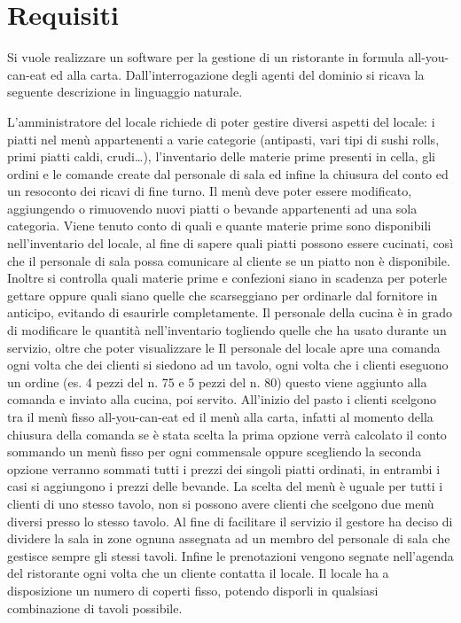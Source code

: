 \documentclass[a4paper,12pt]{report}
\begin{document}
\section{Requisiti}
Si vuole realizzare un software per la gestione di un ristorante in formula all-you-can-eat ed alla carta.
%
Dall’interrogazione degli agenti del dominio si ricava la seguente descrizione in linguaggio naturale.
\begin{mdframed}
    L’amministratore del locale richiede di poter gestire diversi aspetti del locale: i piatti nel menù appartenenti a varie categorie (antipasti, vari tipi di sushi rolls, primi piatti caldi, crudi…), l’inventario delle materie prime presenti in cella, gli ordini e le comande create dal personale di sala ed infine la chiusura del conto ed un resoconto dei ricavi di fine turno.
Il menù deve poter essere modificato, aggiungendo o rimuovendo nuovi piatti o bevande appartenenti ad una sola categoria.
Viene tenuto conto di quali e quante materie prime sono disponibili nell’inventario del locale, al fine di sapere quali piatti possono essere cucinati, così che il personale di sala possa comunicare al cliente se un piatto non è disponibile. Inoltre si controlla quali materie prime e confezioni siano in scadenza per poterle gettare oppure quali siano quelle che scarseggiano per ordinarle dal fornitore in anticipo, evitando di esaurirle completamente.
Il personale della cucina è in grado di modificare le quantità nell’inventario togliendo quelle che ha usato durante un servizio, oltre che poter visualizzare le
Il personale del locale apre una comanda ogni volta che dei clienti si siedono ad un tavolo, ogni volta che i clienti eseguono un ordine (es. 4 pezzi del n. 75 e 5 pezzi del n. 80) questo viene aggiunto alla comanda e inviato alla cucina, poi servito. 
All’inizio del pasto i clienti scelgono tra il menù fisso all-you-can-eat ed il menù alla carta, infatti al momento della chiusura della comanda se è stata scelta la prima opzione verrà calcolato il conto sommando un menù fisso per ogni commensale oppure scegliendo la seconda opzione verranno sommati tutti i prezzi dei singoli piatti ordinati, in entrambi i casi si aggiungono i prezzi delle bevande. La scelta del menù è uguale per tutti i clienti di uno stesso tavolo, non si possono avere clienti che scelgono due menù diversi presso lo stesso tavolo. 
Al fine di facilitare il servizio il gestore ha deciso di dividere la sala in zone ognuna assegnata ad un membro del personale di sala che gestisce sempre gli stessi tavoli.
Infine le prenotazioni vengono segnate nell’agenda del ristorante ogni volta che un cliente contatta il locale. Il locale ha a disposizione un numero di coperti fisso, potendo disporli in qualsiasi combinazione di tavoli possibile.
\end{mdframed}
\end{document}
